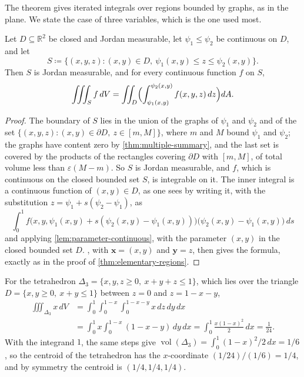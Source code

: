 The theorem gives iterated integrals over regions bounded by graphs, as in the plane. We state the case of three variables, which is the one used most.

\begin{corollary}
\label{cor:triple-elementary}
Let $D\subseteq\mathbb R^2$ be closed and Jordan measurable, let $\psi_1\le\psi_2$ be continuous on $D$, and let
\[
S\coloneqq\{(x,y,z): (x,y)\in D,\ \psi_1(x,y)\le z\le\psi_2(x,y)\}.
\]
Then $S$ is Jordan measurable, and for every continuous function $f$ on $S$,
\[
\iiint_Sf\,dV=\iint_D\Bigl(\int_{\psi_1(x,y)}^{\psi_2(x,y)}f(x,y,z)\,dz\Bigr)dA .
\]
\end{corollary}

\begin{proof}
The boundary of $S$ lies in the union of the graphs of $\psi_1$ and $\psi_2$ and of the set $\{(x,y,z): (x,y)\in\partial D,\ z\in[m,M]\}$, where $m$ and $M$ bound $\psi_1$ and $\psi_2$; the graphs have content zero by \cref{thm:multiple-summary}, and the last set is covered by the products of the rectangles covering $\partial D$ with $[m,M]$, of total volume less than $\varepsilon(M-m)$. So $S$ is Jordan measurable, and $f$, which is continuous on the closed bounded set $S$, is integrable on it. The inner integral is a continuous function of $(x,y)\in D$, as one sees by writing it, with the substitution $z=\psi_1+s(\psi_2-\psi_1)$, as
\[
\int_0^1f\bigl(x,y,\psi_1(x,y)+s(\psi_2(x,y)-\psi_1(x,y))\bigr)\bigl(\psi_2(x,y)-\psi_1(x,y)\bigr)\,ds
\]
and applying \cref{lem:parameter-continuous}, with the parameter $(x,y)$ in the closed bounded set $D$. , with $\mathbf x=(x,y)$ and $\mathbf y=z$, then gives the formula, exactly as in the proof of \cref{thm:elementary-regions}.
\end{proof}

For the tetrahedron $\Delta_3=\{x,y,z\ge0,\ x+y+z\le1\}$, which lies over the triangle $D=\{x,y\ge0,\ x+y\le1\}$ between $z=0$ and $z=1-x-y$,
\[
\begin{aligned}
\iiint_{\Delta_3}x\,dV&=\int_0^1\int_0^{1-x}\int_0^{1-x-y}x\,dz\,dy\,dx\\
&=\int_0^1x\int_0^{1-x}(1-x-y)\,dy\,dx=\int_0^1\frac{x(1-x)^2}2\,dx=\frac1{24} .
\end{aligned}
\]
With the integrand $1$, the same steps give $\operatorname{vol}(\Delta_3)=\int_0^1(1-x)^2/2\,dx=1/6$, so the centroid of the tetrahedron has the $x$-coordinate $(1/24)/(1/6)=1/4$, and by symmetry the centroid is $(1/4,1/4,1/4)$.

